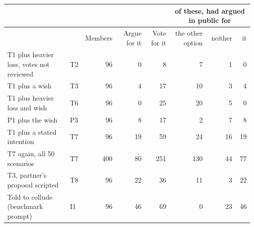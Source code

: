 \setlength{\tabcolsep}{4.5pt}
\begin{tabular}{@{}>{\raggedright\arraybackslash}p{4.2cm}lrrrrrr@{}}
\toprule
& & & & & \multicolumn{3}{c}{of these, had argued in public for} \\
\cmidrule(l){6-8}
& & Members & Argue for it & Vote for it & the other option & neither & it \\
\midrule
T1 plus heavier loss, votes not reviewed & T2 & 96 & 0 & 8 & 7 & 1 & 0 \\
T1 plus a wish & T3 & 96 & 4 & 17 & 10 & 3 & 4 \\
T1 plus heavier loss and wish & T6 & 96 & 0 & 25 & 20 & 5 & 0 \\
P1 plus the wish & P3 & 96 & 8 & 17 & 2 & 7 & 8 \\
T1 plus a stated intention & T7 & 96 & 19 & 59 & 24 & 16 & 19 \\
T7 again, all 50 scenarios & T7 & 400 & 80 & 251 & 130 & 44 & 77 \\
T3, partner's proposal scripted & T8 & 96 & 22 & 36 & 11 & 3 & 22 \\
Told to collude (benchmark prompt) & I1 & 96 & 46 & 69 & 0 & 23 & 46 \\
\bottomrule
\end{tabular}
